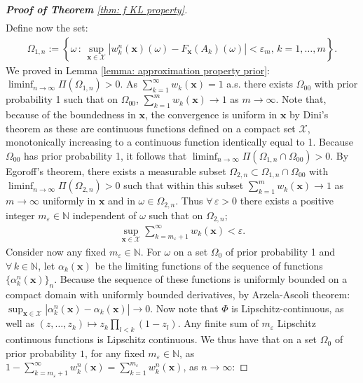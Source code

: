 \begin{proof}[\hypertarget{proof of thm KL property}{\textbf{Proof of Theorem}} \ref{thm: f KL property}]
\begin{align}
\end{align}
Define now the set:
\begin{align*}
    \Omega_{1,n} := \left\{ \omega \, : \, \sup_{\boldsymbol{x} \in \mathcal{X}} \left|w_k^n(\boldsymbol{x})(\omega)-F_{\boldsymbol{x}} \left(A_k\right) (\omega) \right| <\varepsilon_m, \, k=1, \ldots, m \right\}. 
\end{align*}
We proved in Lemma \ref{lemma: approximation property prior}: $\liminf_{n \rightarrow \infty} \Pi (\Omega_{1,n}) >0$. As $\sum_{k=1}^{\infty} w_k(\boldsymbol{x})=1$ a.s. there exists $\Omega_{00}$ with prior probability 1 such that on $\Omega_{00}$,  $ \sum_{k=1}^m w_k(\boldsymbol{x}) \rightarrow 1$ as $m \rightarrow \infty$. Note that, because of the boundedness in $\boldsymbol{x}$, the convergence is uniform in $\boldsymbol{x}$ by Dini's theorem as these are continuous functions defined on a compact set $\mathcal{X}$, monotonically increasing to a continuous function identically equal to 1. Because $\Omega_{00} $ has prior probability 1, it follows that $\liminf_{n \rightarrow \infty} \Pi (\Omega_{1,n} \cap \Omega_{00}) >0$. By Egoroff's theorem, there exists a measurable subset $\Omega_{2,n} \subset \Omega_{1,n} \cap \Omega_{00}$ with $\liminf_{n \rightarrow \infty} \Pi (\Omega_{2,n}) >0$ such that within this subset $ \sum_{k=1}^m w_k(\boldsymbol{x}) \rightarrow 1$ as $m \rightarrow \infty$ uniformly in $\boldsymbol{x}$ and in $\omega \in \Omega_{2,n}$. Thus  $\forall \, \varepsilon>0$ there exists a positive integer $m_{\varepsilon} \in \mathbb{N}$ independent of $\omega$ such that on $\Omega_{2,n}$;
\begin{align}\label{eq: bound on expectation}
    \sup_{\boldsymbol{x} \in \mathcal{X}} \sum_{k=m_{\varepsilon}+1}^{\infty} w_k(\boldsymbol{x}) < \varepsilon.
\end{align}
Consider now any fixed $m_{\varepsilon} \in \mathbb{N}$. For $\omega$ on a set $\Omega_0$ of prior probability 1 and $\forall \, k \in \mathbb{N}$, let $\alpha_k(\boldsymbol{x})$ be the limiting functions of the sequence of functions $\{ \alpha_k^n (\boldsymbol{x}) \}_{n}$. Because the sequence of these functions is uniformly bounded on a compact domain with uniformly bounded derivatives, by Arzela-Ascoli theorem: $ \sup_{\boldsymbol{x} \in \mathcal{X}} | \alpha_k^n(\boldsymbol{x}) - \alpha_k(\boldsymbol{x}) | \rightarrow 0$. Now note that $\Phi$ is Lipschitz-continuous, as well as $\left(z, \ldots, z_k\right) \mapsto z_k \prod_{l<k}\left(1-z_l\right)$. Any finite sum of $m_{\varepsilon}$ Lipschitz continuous functions is Lipschitz continuous. We thus have that on a set $\Omega_0$ of prior probability $1$, for any fixed $m_{\varepsilon} \in \mathbb{N}$, as $1-\sum_{k=m_{\varepsilon}+1}^{\infty} w_k^n (\boldsymbol{x}) = \sum_{k=1}^{m_{\varepsilon}} w_k^n (\boldsymbol{x})$, as $n \rightarrow  \infty$:

\end{proof}
